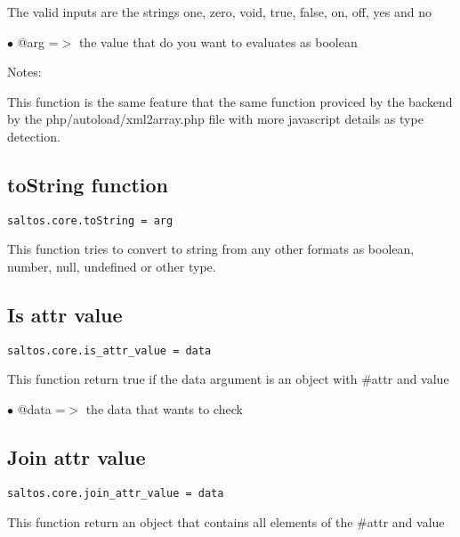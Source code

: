 \documentclass[a4paper]{book}
\begin{document}
The valid inputs are the strings one, zero, void, true, false, on, off, yes and no

\begin{compactitem}
\item[\color{myblue}$\bullet$] @arg =$>$ the value that do you want to evaluates as boolean
\end{compactitem}

Notes:

This function is the same feature that the same function proviced by the backend by the
php/autoload/xml2array.php file with more javascript details as type detection.

\hypertarget{toc524}{}
\subsection{toString function}

\begin{lstlisting}
saltos.core.toString = arg
\end{lstlisting}

This function tries to convert to string from any other formats as boolean,
number, null, undefined or other type.

\hypertarget{toc525}{}
\subsection{Is attr value}

\begin{lstlisting}
saltos.core.is_attr_value = data
\end{lstlisting}

This function return true if the data argument is an object with \#attr and value

\begin{compactitem}
\item[\color{myblue}$\bullet$] @data =$>$ the data that wants to check
\end{compactitem}

\hypertarget{toc526}{}
\subsection{Join attr value}

\begin{lstlisting}
saltos.core.join_attr_value = data
\end{lstlisting}

This function return an object that contains all elements of the \#attr and value
\end{document}
